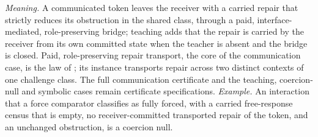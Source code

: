 \emph{Meaning.} A communicated token leaves the receiver with a carried repair that strictly reduces
its obstruction in the shared class, through a paid, interface-mediated, role-preserving bridge;
teaching adds that the repair is carried by the receiver from its own committed state when the
teacher is absent and the bridge is closed. Paid, role-preserving repair transport, the core of the
communication case, is the law of ; its instance transports repair across two
distinct contexts of one challenge class. The full communication certificate and the teaching,
coercion-null and symbolic cases remain certificate specifications.
\emph{Example.} An interaction that a force comparator classifies as fully forced, with a carried
free-response census that is empty, no receiver-committed transported repair of the token, and an
unchanged obstruction, is a coercion null.
